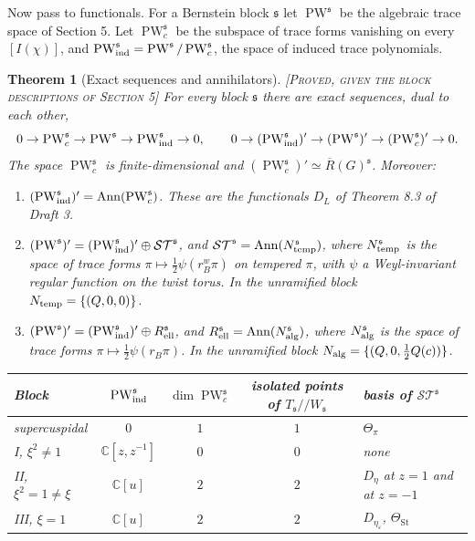 \documentclass[12pt,letterpaper]{amsart}
\numberwithin{equation}{section}
\newtheorem{theorem}{Theorem}[section]
\theoremstyle{definition}
\theoremstyle{remark}
\newcommand{\St}{\mathrm{St}}
\newcommand{\PW}{\operatorname{PW}}
\newcommand{\ST}{\mathcal{ST}}
\newcommand{\Ann}{\operatorname{Ann}}
\newcommand{\status}[1]{\textup{[\textsc{#1}]}}
\begin{document}
Now pass to functionals. For a Bernstein block $\mathfrak s$ let $\PW^{\mathfrak s}$ be the algebraic trace space of Section 5. Let $\PW^{\mathfrak s}_c$ be the subspace of trace forms vanishing on every $[I(\chi)]$, and $\PW^{\mathfrak s}_{\rm ind}=\PW^{\mathfrak s}/\PW^{\mathfrak s}_c$, the space of induced trace polynomials.

\begin{theorem}[Exact sequences and annihilators]\label{thm:exact}\status{Proved, given the block descriptions of Section 5}
For every block $\mathfrak s$ there are exact sequences, dual to each other,
\[
0\to\PW_c^{\mathfrak s}\to\PW^{\mathfrak s}\to\PW^{\mathfrak s}_{\rm ind}\to0,\qquad
0\to(\PW^{\mathfrak s}_{\rm ind})'\to(\PW^{\mathfrak s})'\to(\PW^{\mathfrak s}_c)'\to0 .
\]
The space $\PW_c^{\mathfrak s}$ is finite-dimensional and $(\PW_c^{\mathfrak s})'\simeq\overline R(G)^{\mathfrak s}$. Moreover:
\begin{enumerate}[label=(\alph*),leftmargin=*]
\item $(\PW^{\mathfrak s}_{\rm ind})'=\Ann(\PW^{\mathfrak s}_c)$. These are the functionals $D_L$ of Theorem 8.3 of Draft 3.
\item $(\PW^{\mathfrak s})'=(\PW^{\mathfrak s}_{\rm ind})'\oplus\ST^{\mathfrak s}$, and $\ST^{\mathfrak s}=\Ann(N^{\mathfrak s}_{\rm temp})$, where $N^{\mathfrak s}_{\rm temp}$ is the space of trace forms $\pi\mapsto\tfrac12\psi(r_B^w\pi)$ on tempered $\pi$, with $\psi$ a Weyl-invariant regular function on the twist torus. In the unramified block $N_{\rm temp}=\{(Q,0,0)\}$.
\item $(\PW^{\mathfrak s})'=(\PW^{\mathfrak s}_{\rm ind})'\oplus R^{\mathfrak s}_{\rm ell}$, and $R_{\rm ell}^{\mathfrak s}=\Ann(N^{\mathfrak s}_{\rm alg})$, where $N^{\mathfrak s}_{\rm alg}$ is the space of trace forms $\pi\mapsto\tfrac12\psi(r_B\pi)$. In the unramified block $N_{\rm alg}=\{(Q,0,\tfrac12Q(c))\}$.
\end{enumerate}
\begin{center}\small
\begin{tabular}{@{}lcccl@{}}\toprule
Block & $\PW_{\rm ind}^{\mathfrak s}$ & $\dim\PW_c^{\mathfrak s}$ & isolated points of $T_{\mathfrak s}/\!/W_{\mathfrak s}$ & basis of $\ST^{\mathfrak s}$\\\midrule
supercuspidal & $0$ & $1$ & $1$ & $\Theta_\pi$\\
I, $\xi^2\ne1$ & $\mathbb C[z,z^{-1}]$ & $0$ & $0$ & none\\
II, $\xi^2=1\ne\xi$ & $\mathbb C[u]$ & $2$ & $2$ & $D_\eta$ at $z=1$ and at $z=-1$\\
III, $\xi=1$ & $\mathbb C[u]$ & $2$ & $2$ & $D_{\eta_\varepsilon}$, $\Theta_{\St}$\\\bottomrule
\end{tabular}
\end{center}
\end{theorem}
\end{document}
